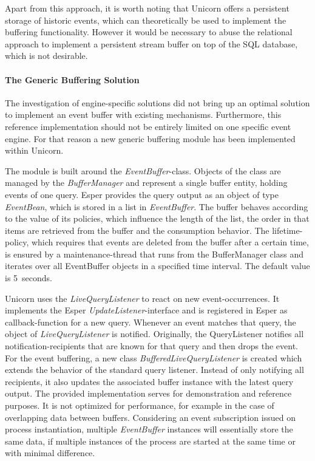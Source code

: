 Apart from this approach, it is worth noting that Unicorn offers a persistent storage of historic events, which can theoretically be used to implement the buffering functionality.
However it would be necessary to abuse the relational approach to implement a persistent stream buffer on top of the SQL database, which is not desirable.

\paragraph{The Generic Buffering Solution}
The investigation of engine-specific solutions did not bring up an optimal solution to implement an event buffer with existing mechanisms.
Furthermore, this reference implementation should not be entirely limited on one specific event engine.
For that reason a new generic buffering module has been implemented within Unicorn. 

The module is built around the \textit{EventBuffer}-class. Objects of the class are managed by the \textit{BufferManager} and represent a single buffer entity, holding events of one query. Esper provides the query output as an object of type \textit{EventBean}, which is stored in a list in \textit{EventBuffer}.
The buffer behaves according to the value of its policies, which influence the length of the list, the order in that items are retrieved from the buffer and the consumption behavior.
The lifetime-policy, which requires that events are deleted from the buffer after a certain time, is ensured by a maintenance-thread that runs from the BufferManager class and iterates over all EventBuffer objects in a specified time interval. The default value is 5~seconds.

Unicorn uses the \textit{LiveQueryListener} to react on new event-occurrences. It implements the Esper \textit{UpdateListener}-interface and is registered in Esper as callback-function for a new query. Whenever an event matches that query, the object of \textit{LiveQueryListener} is notified.
Originally, the QueryListener notifies all notification-recipients that are known for that query and then drops the event.
For the event buffering, a new class \textit{BufferedLiveQueryListener} is created which extends the behavior of the standard query listener. Instead of only notifying all recipients, it also updates the associated buffer instance with the latest query output.
The provided implementation serves for demonstration and reference purposes. It is not optimized for performance, for example in the case of overlapping data between buffers. Considering an event subscription issued on process instantiation, multiple \textit{EventBuffer} instances will essentially store the same data, if multiple instances of the process are started at the same time or with minimal difference.

